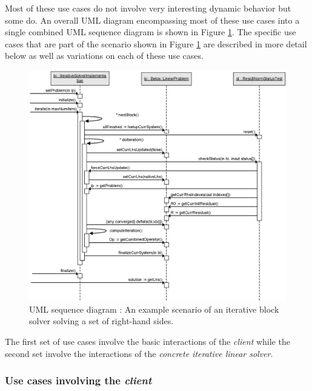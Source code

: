 \documentclass[pdf,ps2pdf,11pt]{SANDreport}
\begin{document}
Most of these use cases do not involve very interesting dynamic
behavior but some do.  An overall UML diagram encompassing most of
these use cases into a single combined UML sequence diagram is shown
in Figure {}\ref{belos:fig:BelosSequence}.  The specific use cases
that are part of the scenario shown in Figure
{}\ref{belos:fig:BelosSequence} are described in more detail below as
well as variations on each of these use cases.

{\bsinglespace
\begin{figure}
\begin{center}
\includegraphics*[scale=0.85]{BelosSequence}
\end{center}
\caption{
\label{belos:fig:BelosSequence}
UML sequence diagram : An example
scenario of an iterative block solver solving a set of right-hand
sides.}
\end{figure}
\esinglespace}

The first set of use cases involve the basic interactions of the
{}\textit{client} while the second set involve the interactions of the
{}\textit{concrete iterative linear solver}.

\subsubsection*{Use cases involving the {}\textit{client}}
\end{document}
